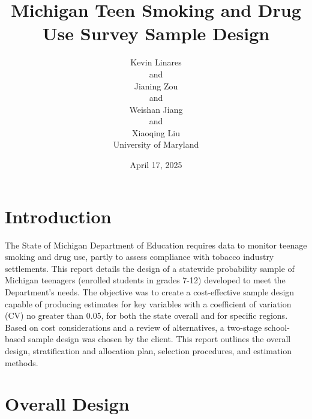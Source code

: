 \documentclass[
  12pt]{article}
\begin{document}
\def\spacingset#1{\renewcommand{\baselinestretch}%
{#1}\small\normalsize} \spacingset{1}



\date{April 17, 2025}
\title{\bf Michigan Teen Smoking and Drug Use Survey Sample Design}
\author{
Kevin Linares\\
and\\Jianing Zou\\
and\\Weishan Jiang\\
and\\Xiaoqing Liu\\
University of Maryland\\
}
\maketitle

\bigskip
\bigskip
\begin{abstract}

\end{abstract}


\newpage
\spacingset{1.9} %


\section{Introduction}\label{sec-intro}

The State of Michigan Department of Education requires data to monitor
teenage smoking and drug use, partly to assess compliance with tobacco
industry settlements. This report details the design of a statewide
probability sample of Michigan teenagers (enrolled students in grades
7-12) developed to meet the Department's needs. The objective was to
create a cost-effective sample design capable of producing estimates for
key variables with a coefficient of variation (CV) no greater than 0.05,
for both the state overall and for specific regions. Based on cost
considerations and a review of alternatives, a two-stage school-based
sample design was chosen by the client. This report outlines the overall
design, stratification and allocation plan, selection procedures, and
estimation methods.

\section{Overall Design}\label{sec-meth}
\end{document}

